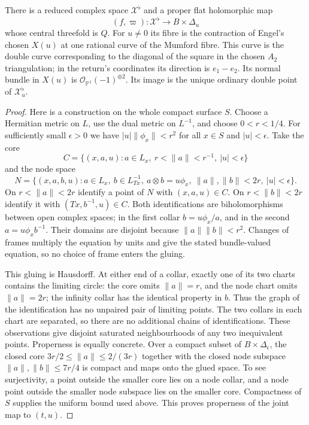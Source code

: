 \begin{theorem}[A.1.2; Proved]\label{push:A12}
There is a reduced complex space $\mathcal X^\flat$ and a proper flat
holomorphic map
\[
 (f,\varpi):\mathcal X^\flat\longrightarrow B\times\Delta_u
\]
whose central threefold is $Q$. For $u\ne0$ its fibre is the
contraction of Engel's chosen $X(u)$ at one rational curve of the
Mumford fibre. This curve is the double curve corresponding to the
diagonal of the square in the chosen $A_2$ triangulation; in the
return's coordinates its direction is $e_1-e_2$. Its normal bundle
in $X(u)$ is $\mathcal O_{\mathbb P^1}(-1)^{\oplus2}$. Its image is
the unique ordinary double point of $\mathcal X^\flat_u$.
\end{theorem}
\begin{proof}
Here is a construction on the whole compact surface $S$. Choose a
Hermitian metric on $L$, use the dual metric on $L^{-1}$, and choose
$0<r<1/4$. For sufficiently small $\epsilon>0$ we have
$|u|\|\phi_x\|<r^2$ for all $x\in S$ and $|u|<\epsilon$.
Take the core
\[
 C=\{(x,a,u):a\in L_x,\ r<\|a\|<r^{-1},\ |u|<\epsilon\}
\]
and the node space
\[
 N=\{(x,a,b,u):a\in L_x,\ b\in L^{-1}_{Tx},\
 a\otimes b=u\phi_x,\ \|a\|,\|b\|<2r,\ |u|<\epsilon\}.
\]
On $r<\|a\|<2r$ identify a point of $N$ with $(x,a,u)\in C$.
On $r<\|b\|<2r$ identify it with $(Tx,b^{-1},u)\in C$.
Both identifications are biholomorphisms between open complex spaces;
in the first collar $b=u\phi_x/a$, and in the second
$a=u\phi_xb^{-1}$. Their domains are disjoint because
$\|a\|\|b\|<r^2$. Changes of frames multiply the equation by
units and give the stated bundle-valued equation, so no choice of
frame enters the gluing.

This gluing is Hausdorff. At either end of a collar, exactly one
of its two charts contains the limiting circle: the core omits
$\|a\|=r$, and the node chart omits $\|a\|=2r$; the infinity
collar has the identical property in $b$. Thus the graph of the
identification has no unpaired pair of limiting points. The two
collars in each chart are separated, so there are no additional
chains of identifications. These observations give disjoint
saturated neighbourhoods of any two inequivalent points. Properness
is equally concrete. Over a compact subset of $B\times\Delta_\epsilon$,
the closed core $3r/2\leq\|a\|\leq2/(3r)$ together with the
closed node subspace $\|a\|,\|b\|\leq7r/4$ is compact and maps
onto the glued space. To see surjectivity, a point outside the smaller
core lies on a node collar, and a node point outside the smaller
node subspace lies on the smaller core. Compactness of $S$ supplies
the uniform bound used above. This proves properness of the joint
map to $(t,u)$.


\end{proof}
